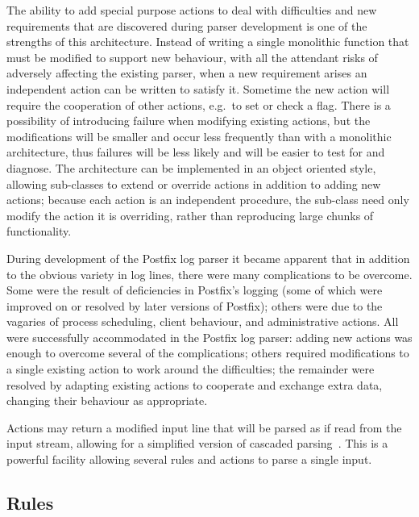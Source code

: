 \documentclass{svmult}
\begin{document}
The ability to add special purpose actions to deal with difficulties and
new requirements that are discovered during parser development is one of
the strengths of this architecture.  Instead of writing a single monolithic
function that must be modified to support new behaviour, with all the
attendant risks of adversely affecting the existing parser, when a new
requirement arises an independent action can be written to satisfy it.
Sometime the new action will require the cooperation of other actions,
e.g.\ to set or check a flag.  There is a possibility of introducing
failure when modifying existing actions, but the modifications will be
smaller and occur less frequently than with a monolithic architecture, thus
failures will be less likely and will be easier to test for and diagnose.
The architecture can be implemented in an object oriented style, allowing
sub-classes to extend or override actions in addition to adding new
actions; because each action is an independent procedure, the sub-class
need only modify the action it is overriding, rather than reproducing large
chunks of functionality.

During development of the Postfix log parser it became apparent that in
addition to the obvious variety in log lines, there were many complications
to be overcome.  Some were the result of deficiencies in Postfix's logging
(some of which were improved on or resolved by later versions of Postfix);
others were due to the vagaries of process scheduling, client behaviour,
and administrative actions.  All were successfully accommodated in the
Postfix log parser: adding new actions was enough to overcome several of
the complications; others required modifications to a single existing
action to work around the difficulties; the remainder were resolved by
adapting existing actions to cooperate and exchange extra data, changing
their behaviour as appropriate.

Actions may return a modified input line that will be parsed as if read
from the input stream, allowing for a simplified version of cascaded
parsing~\cite{cascaded-parsing}.  This is a powerful facility allowing
several rules and actions to parse a single input.

\subsection{Rules}

\label{Rules}
\end{document}
